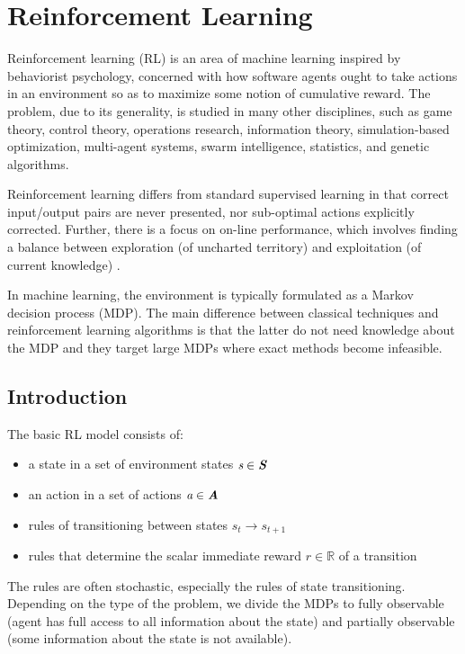 
\chapter{Reinforcement Learning}
\label{chapter:rl}

Reinforcement learning (RL) is an area of machine learning inspired by behaviorist psychology, concerned with how software agents ought to take actions in an environment so as to maximize some notion of cumulative reward. The problem, due to its generality, is studied in many other disciplines, such as game theory, control theory, operations research, information theory, simulation-based optimization, multi-agent systems, swarm intelligence, statistics, and genetic algorithms. 

Reinforcement learning differs from standard supervised learning in that correct input/output pairs are never presented, nor sub-optimal actions explicitly corrected. Further, there is a focus on on-line performance, which involves finding a balance between exploration (of uncharted territory) and exploitation (of current knowledge) \cite{cite:wiki-rl}.

In machine learning, the environment is typically formulated as a Markov decision process (MDP). The main difference between classical techniques and reinforcement learning algorithms is that the latter do not need knowledge about the MDP and they target large MDPs where exact methods become infeasible.

\section{Introduction}
The basic RL model consists of:
\begin{itemize}
\item a state in a set of environment states $\textit{s} \in \textbf{\textit{S}}$
\item an action in a set of actions $\textit{a} \in \textbf{\textit{A}}$
\item rules of transitioning between states $s_t\to s_{t+1}$

\item rules that determine the scalar immediate reward $r \in \mathbb{R}$ of a transition
\end{itemize}
The rules are often stochastic, especially the rules of state transitioning. Depending on the type of the problem, we divide the MDPs to fully observable (agent has full access to all information about the state) and partially observable (some information about the state is not available).

